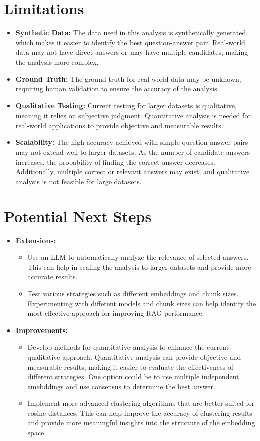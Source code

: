 \documentclass{scrartcl}
\begin{document}
\section{Limitations}
\begin{itemize}
    \item \textbf{Synthetic Data:} The data used in this analysis is synthetically generated, which makes it easier to identify the best question-answer pair. Real-world data may not have direct answers or may have multiple candidates, making the analysis more complex.
    \item \textbf{Ground Truth:} The ground truth for real-world data may be unknown, requiring human validation to ensure the accuracy of the analysis.
    \item \textbf{Qualitative Testing:} Current testing for larger datasets is qualitative, meaning it relies on subjective judgment. Quantitative analysis is needed for real-world applications to provide objective and measurable results.
    \item \textbf{Scalability:} The high accuracy achieved with simple question-answer pairs may not extend well to larger datasets. As the number of candidate answers increases, the probability of finding the correct answer decreases. Additionally, multiple correct or relevant answers may exist, and qualitative analysis is not feasible for large datasets.
\end{itemize}

\section{Potential Next Steps}
\begin{itemize}
    \item \textbf{Extensions:} 
    \begin{itemize}
        \item Use an LLM to automatically analyze the relevance of selected answers. This can help in scaling the analysis to larger datasets and provide more accurate results.
        \item Test various strategies such as different embeddings and chunk sizes. Experimenting with different models and chunk sizes can help identify the most effective approach for improving RAG performance.
    \end{itemize}
    \item \textbf{Improvements:} 
    \begin{itemize}
        \item Develop methods for quantitative analysis to enhance the current qualitative approach. Quantitative analysis can provide objective and measurable results, making it easier to evaluate the effectiveness of different strategies. One option could be to use multiple independent emebddings and use consensus to determine the best answer.
        \item Implement more advanced clustering algorithms that are better suited for cosine distances. This can help improve the accuracy of clustering results and provide more meaningful insights into the structure of the embedding space.
    \end{itemize}
\end{itemize}
\end{document}
